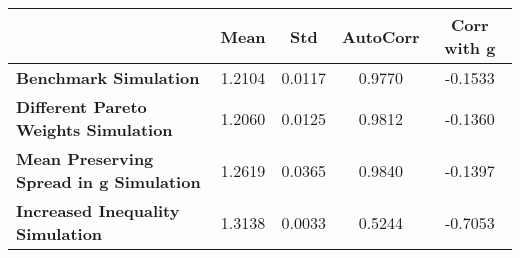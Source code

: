 \begin{tiny}\begin{tabular}{|l|c|c|c|c|}
\hline
&\textbf{Mean}&\textbf{Std}&\textbf{AutoCorr}&\textbf{Corr with g}\\\hline
\textbf{Benchmark Simulation}&1.2104&0.0117&0.9770&-0.1533\\\hline
\textbf{Different Pareto Weights Simulation}&1.2060&0.0125&0.9812&-0.1360\\\hline
\textbf{Mean Preserving Spread in g Simulation}&1.2619&0.0365&0.9840&-0.1397\\\hline
\textbf{Increased Inequality Simulation}&1.3138&0.0033&0.5244&-0.7053\\\hline
\end{tabular}
\end{tiny}